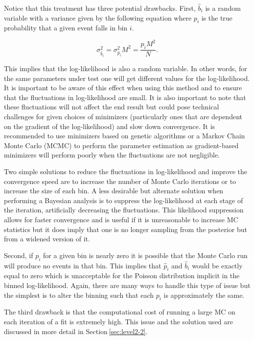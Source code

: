 \documentclass[11pt,a4paper]{article}
\newcommand\secref[1]{Section\,\ref{#1}}
\begin{document}
Notice that this treatment has three potential drawbacks.  First, $\hat{b}_i$ is a random variable with a variance given by the following equation where $p_i$ is the true probability that a given event falls in bin $i$.

\begin{equation}
\sigma_{\hat{b}_i}^2 = \sigma_{\hat{p}_i}^2 M^2 = \frac{p_i M^2}{N}.
\end{equation}

This implies that the log-likelihood is also a random variable.  In other words, for the same parameters under test one will get different values for the log-likelihood.  It is important to be aware of this effect when using this method and to ensure that the fluctuations in log-likelihood are small.  It is also important to note that these fluctuations will not affect the end result but could pose technical challenges for given choices of minimizers (particularly ones that are dependent on the gradient of the log-likelihood) and slow down convergence.  It is recommended to use minimizers based on genetic algorithms or a Markov Chain Monte Carlo (MCMC) to perform the parameter estimation as gradient-based minimizers will perform poorly when the fluctuations are not negligible.

Two simple solutions to reduce the fluctuations in log-likelihood and improve the convergence speed are to increase the number of Monte Carlo iterations or to increase the size of each bin.  A less desirable but alternate solution when performing a Bayesian analysis is to suppress the log-likelihood at each stage of the iteration, artificially decreasing the fluctuations.  This likelihood suppression allows for faster convergence and is useful if it is unreasonable to increase MC statistics but it does imply that one is no longer sampling from the posterior but from a widened version of it.



Second, if $p_i$ for a given bin is nearly zero it is possible that the Monte Carlo run will produce no events in that bin.  This implies that $\hat{p}_i$ and $\hat{b}_i$ would be exactly equal to zero which is unacceptable for the Poisson distribution implicit in the binned log-likelihood.  Again, there are many ways to handle this type of issue but the simplest is to alter the binning such that each $p_i$ is approximately the same. 

The third drawback is that the computational cost of running a large MC on each iteration of a fit is extremely high.  This issue and the solution used are discussed in more detail in \secref{sec:level2-2}.
\end{document}
